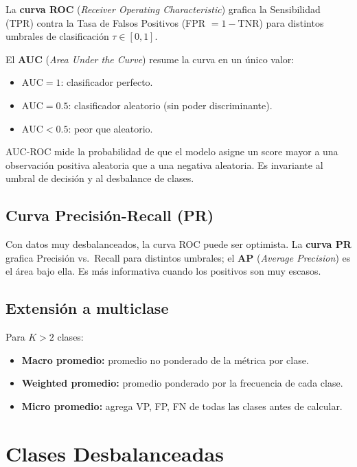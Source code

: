\documentclass[12pt, a4paper]{article}
\theoremstyle{definition}
\theoremstyle{plain}
\theoremstyle{remark}
\begin{document}
La \textbf{curva ROC} (\textit{Receiver Operating Characteristic}) grafica la Sensibilidad (TPR) contra la Tasa de Falsos Positivos (FPR $= 1 - \text{TNR}$) para distintos umbrales de clasificación $\tau \in [0,1]$.

El \textbf{AUC} (\textit{Area Under the Curve}) resume la curva en un único valor:
\begin{itemize}
  \item $\text{AUC} = 1$: clasificador perfecto.
  \item $\text{AUC} = 0.5$: clasificador aleatorio (sin poder discriminante).
  \item $\text{AUC} < 0.5$: peor que aleatorio.
\end{itemize}

\begin{conceptoclave}
  AUC-ROC mide la probabilidad de que el modelo asigne un score mayor a una observación positiva aleatoria que a una negativa aleatoria. Es invariante al umbral de decisión y al desbalance de clases.
\end{conceptoclave}

\subsection{Curva Precisión-Recall (PR)}

Con datos muy desbalanceados, la curva ROC puede ser optimista. La \textbf{curva PR} grafica Precisión vs.\ Recall para distintos umbrales; el \textbf{AP} (\textit{Average Precision}) es el área bajo ella. Es más informativa cuando los positivos son muy escasos.

\subsection{Extensión a multiclase}

Para $K > 2$ clases:
\begin{itemize}
  \item \textbf{Macro promedio:} promedio no ponderado de la métrica por clase.
  \item \textbf{Weighted promedio:} promedio ponderado por la frecuencia de cada clase.
  \item \textbf{Micro promedio:} agrega VP, FP, FN de todas las clases antes de calcular.
\end{itemize}

\section{Clases Desbalanceadas}
\end{document}
